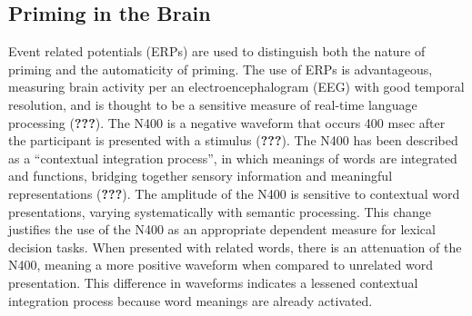 \documentclass[english,man]{apa6}
\theoremstyle{definition}
\theoremstyle{definition}
\theoremstyle{definition}
\theoremstyle{remark}
\begin{document}
\subsection{Priming in the Brain}\label{priming-in-the-brain}

Event related potentials (ERPs) are used to distinguish both the nature
of priming and the automaticity of priming. The use of ERPs is
advantageous, measuring brain activity per an electroencephalogram (EEG)
with good temporal resolution, and is thought to be a sensitive measure
of real-time language processing ({\textbf{???}}). The N400 is a
negative waveform that occurs 400 msec after the participant is
presented with a stimulus ({\textbf{???}}). The N400 has been described
as a \enquote{contextual integration process}, in which meanings of
words are integrated and functions, bridging together sensory
information and meaningful representations ({\textbf{???}}). The
amplitude of the N400 is sensitive to contextual word presentations,
varying systematically with semantic processing. This change justifies
the use of the N400 as an appropriate dependent measure for lexical
decision tasks. When presented with related words, there is an
attenuation of the N400, meaning a more positive waveform when compared
to unrelated word presentation. This difference in waveforms indicates a
lessened contextual integration process because word meanings are
already activated.
\end{document}
